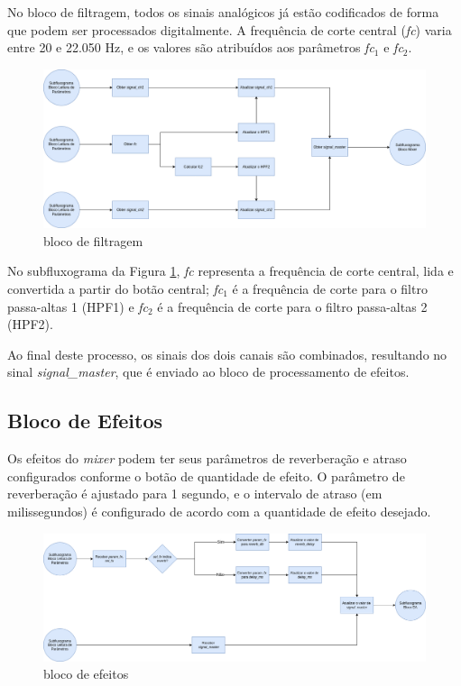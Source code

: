 No bloco de filtragem, todos os sinais analógicos já estão codificados de forma que podem ser processados digitalmente. A frequência de corte central (\textit{fc}) varia entre 20 e 22.050 Hz, e os valores são atribuídos aos parâmetros \textit{fc$_{1}$} e \textit{fc$_{2}$}.

\begin{figure}[h]
    \centering
    \includegraphics[width=\textwidth]{figuras/fig55.png}
    \caption{bloco de filtragem}
    \label{fig55}
\end{figure}

No subfluxograma da Figura \ref{fig55}, \textit{fc} representa a frequência de corte central, lida e convertida a partir do botão central; \textit{fc$_{1}$} é a frequência de corte para o filtro passa-altas 1 (HPF1) e \textit{fc$_{2}$} é a frequência de corte para o filtro passa-altas 2 (HPF2).

Ao final deste processo, os sinais dos dois canais são combinados, resultando no sinal \textit{signal\_master}, que é enviado ao bloco de processamento de efeitos.

\subsection{Bloco de Efeitos}

Os efeitos do \textit{mixer} podem ter seus parâmetros de reverberação e atraso configurados conforme o botão de quantidade de efeito. O parâmetro de reverberação é ajustado para 1 segundo, e o intervalo de atraso (em milissegundos) é configurado de acordo com a quantidade de efeito desejado.

\begin{figure}[h]
    \centering
    \includegraphics[width=\textwidth]{figuras/fig56.png}
    \caption{bloco de efeitos}
    \label{fig56}
\end{figure}

